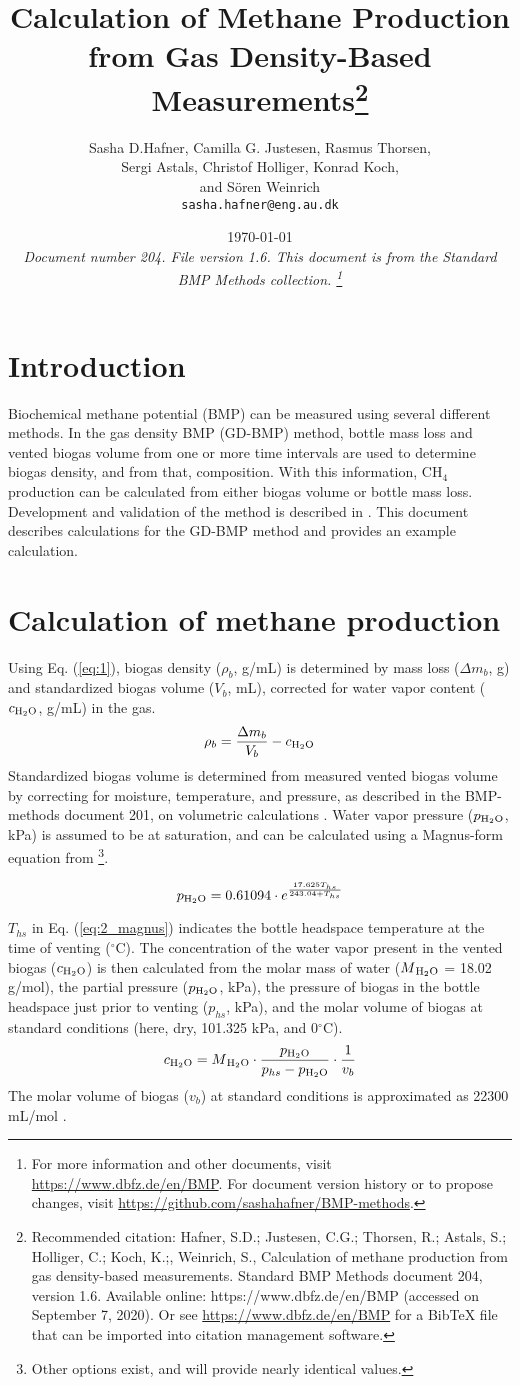 \documentclass[]{article}
\title {Calculation of Methane Production from Gas Density-Based Measurements\footnote{
  Recommended citation: 
Hafner, S.D.; Justesen, C.G.; Thorsen, R.; Astals, S.; Holliger, C.; Koch, K.;, Weinrich, S., Calculation of methane production from gas density-based measurements. Standard BMP Methods document 204, version 1.6. Available online: https://www.dbfz.de/en/BMP (accessed on September 7, 2020).
\newline
  Or see \url{https://www.dbfz.de/en/BMP} for a BibTeX file that can be imported into citation management software.
}
}
\author{Sasha D.Hafner, Camilla G. Justesen, Rasmus Thorsen, \\ Sergi Astals, Christof Holliger, Konrad Koch, \\ and S{\"o}ren Weinrich
\\
\texttt{sasha.hafner@eng.au.dk}\\
}
\date{\today \\
\bigskip
\textit{
  Document number 204.
  File version 1.6. 
  This document is from the Standard BMP Methods collection.
    \footnote{For more information and other documents, visit \url{https://www.dbfz.de/en/BMP}. 
    For document version history or to propose changes, visit \url{https://github.com/sashahafner/BMP-methods}.}
}
}
\begin{document}
\maketitle

\section{Introduction}
Biochemical methane potential (BMP) can be measured using several different methods.
In the gas density BMP (GD-BMP) method, bottle mass loss and vented biogas volume from one or more time intervals are used to determine biogas density, and from that, composition. 
With this information, CH$_4$ production can be calculated from either biogas volume or bottle mass loss.
Development and validation of the method is described in \citet{justesenDevelopmentValidationLowcost2019}.
This document describes calculations for the GD-BMP method and provides an example calculation.

\section{Calculation of methane production}
Using Eq. (\ref{eq:1}), biogas density ($\rho_b$, g/mL) is determined by mass loss ($\Delta m_b$, g) and standardized biogas volume ($V_b$, mL), corrected for water vapor content ($c\textsubscript{H$_2$O}$, g/mL) in the gas. 
\begin{equation}
  \label{eq:1}
  \rho_b=\frac{\Delta m_b}{V_b}-c\textsubscript{H$_2$O}
\end{equation}
Standardized biogas volume is determined from measured vented biogas volume by correcting for moisture, temperature, and pressure, as described in the BMP-methods document 201, on volumetric calculations \citep{BMPdoc201vol}.
Water vapor pressure ($p\textsubscript{H$_2$O}$, kPa) is assumed to be at saturation, and can be calculated using a Magnus-form equation from \citet{alduchovImprovedMagnusForm1996}\footnote{
  Other options exist, and will provide nearly identical values.
}.

\begin{equation}
\label{eq:2_magnus}
   p\textsubscript{H$_2$O} = 0.61094 \cdot e^{\frac{17.625 T_{hs}}{243.04 + T_{hs}}}
\end{equation}

$T_{hs}$ in Eq. (\ref{eq:2_magnus}) indicates the bottle headspace temperature at the time of venting ($^\circ$C). 
The concentration of the water vapor present in the vented biogas ($c\textsubscript{H$_2$O}$) is then calculated from the molar mass of water ($M\textsubscript{H$_2$O}$ = 18.02 g/mol), the partial pressure ($p\textsubscript{H$_2$O}$, kPa), the pressure of biogas in the bottle headspace just prior to venting ($p_{hs}$, kPa), and the molar volume of biogas at standard conditions (here, dry, 101.325 kPa, and 0$^\circ$C).
\begin{equation}
  \label{eq:3}
  c\textsubscript{H$_2$O}=M\textsubscript{H$_2$O} \cdot \frac{p\textsubscript{H$_2$O}}{p_{hs} - p\textsubscript{H$_2$O}} \cdot \frac{1}{v_b}
\end{equation}
The molar volume of biogas ($v_b$) at standard conditions is approximated as 22300 mL/mol \citep{hafnerValidationSimpleGravimetric2015}.
\end{document}

